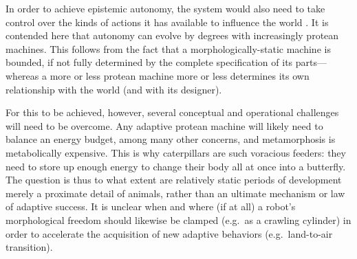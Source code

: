 
In order to achieve epistemic autonomy,
the system would also need to take control over the kinds of actions it has available to influence the world \cite{cariani1993evolve}.
It is contended here that autonomy can evolve by degrees with increasingly protean machines.
This follows from the fact that a morphologically-static machine is bounded, if not fully determined by the complete specification of its parts---%
whereas a more or less protean machine more or less determines its own relationship with the world (and with its designer).




For this to be achieved, however, several conceptual and operational challenges will need to be overcome. 
Any adaptive protean machine will
likely
need to balance an energy budget,
among many other concerns,
and metamorphosis is metabolically expensive.
This is why caterpillars are such
voracious feeders:
they need to store up enough energy to change their body all at once into a butterfly.
The question is thus to what extent are relatively static periods of development 
merely a proximate detail of animals,
rather than an ultimate mechanism \cite{tinbergen1963aims} or law of adaptive success.
It is unclear
when and where (if at all) a robot's morphological freedom should likewise be clamped (e.g.~as a crawling cylinder) in order to accelerate the acquisition of new adaptive behaviors (e.g.~land-to-air transition).

